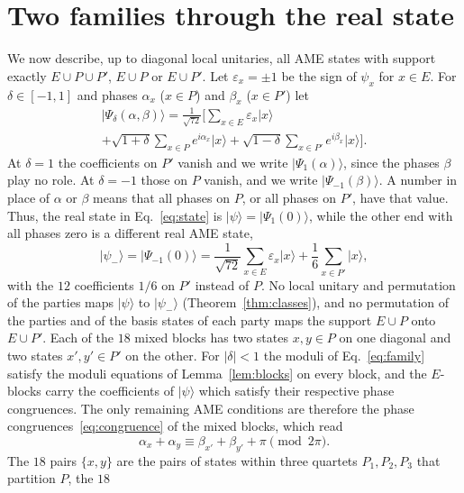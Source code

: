 \documentclass[aps,pra,reprint,superscriptaddress,amsmath,amssymb,longbibliography]{revtex4-2}
\newcommand{\ket}[1]{\lvert #1\rangle}
\theoremstyle{plain}
\begin{document}
\section{Two families through the real state}\label{sec:families}

We now describe, up to diagonal local unitaries, all AME states with support exactly $E\cup P\cup P'$, $E\cup P$ or
$E\cup P'$.  Let $\varepsilon_x=\pm1$ be the sign of $\psi_x$ for $x\in E$.  For $\delta\in[-1,1]$ and phases
$\alpha_x$ ($x\in P$) and $\beta_x$ ($x\in P'$) let
\begin{multline}\label{eq:family}
\ket{\Psi_\delta(\alpha,\beta)}=\frac1{\sqrt{72}}\Big[\sum_{x\in E}\varepsilon_x\ket x\\
+\sqrt{1+\delta}\sum_{x\in P}e^{i\alpha_x}\ket x+\sqrt{1-\delta}\sum_{x\in P'}e^{i\beta_x}\ket x\Big].
\end{multline}
At $\delta=1$ the coefficients on $P'$ vanish and we write $\ket{\Psi_1(\alpha)}$, since the phases $\beta$ play no
role.  At $\delta=-1$ those on $P$ vanish, and we write $\ket{\Psi_{-1}(\beta)}$.  A number in place of
$\alpha$ or $\beta$ means that all phases on $P$, or all phases on $P'$, have that value.  Thus, the real state in Eq.~\eqref{eq:state} is $\ket\psi=\ket{\Psi_1(0)}$,
while the other end with all phases zero is a different real AME state,
\begin{equation}\label{eq:psiminus}
\ket{\psi_-}=\ket{\Psi_{-1}(0)}=\frac1{\sqrt{72}}\sum_{x\in E}\varepsilon_x\ket x+\frac16\sum_{x\in P'}\ket x ,
\end{equation}
with the $12$ coefficients $1/6$ on $P'$ instead of $P$.  No local unitary and permutation of the parties maps
$\ket\psi$ to $\ket{\psi_-}$ (Theorem~\ref{thm:classes}), and no permutation of the parties and of the basis states
of each party maps the support $E\cup P$ onto $E\cup P'$.  Each of the
$18$ mixed blocks has two states $x,y\in P$ on one diagonal and two states $x',y'\in P'$ on
the other.  For $|\delta|<1$ the moduli of Eq.~\eqref{eq:family} satisfy the moduli equations of
Lemma~\ref{lem:blocks} on every block, and the $E$-blocks carry the coefficients of $\ket\psi$ which satisfy their respective
phase congruences.  The only remaining AME conditions are therefore the phase congruences~\eqref{eq:congruence} of the
mixed blocks, which read
\begin{equation}\label{eq:mixed}
\alpha_x+\alpha_y\equiv\beta_{x'}+\beta_{y'}+\pi\pmod{2\pi}.
\end{equation}
The $18$ pairs $\{x,y\}$ are the pairs of states within three quartets $P_1,P_2,P_3$ that partition $P$, the $18$
\end{document}
